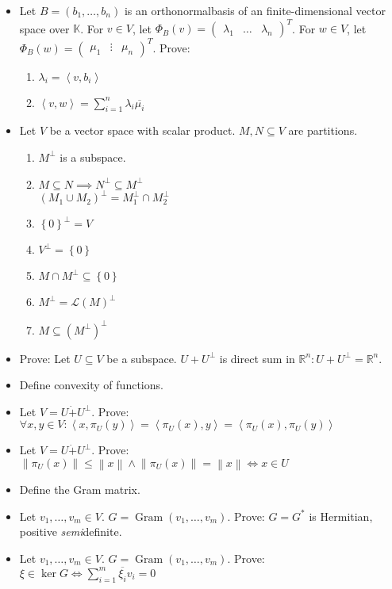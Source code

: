 \documentclass[a4paper]{article}
\newcommand{\set}[1]{\left\{#1\right\}}
\newcommand{\ip}[2]{\left\langle#1,#2\right\rangle} %
\newcommand{\norm}[1]{\left\|#1\right\|}
\begin{document}
\begin{itemize}
  \item Let $B = (b_1, \ldots, b_n)$ is an orthonormalbasis of an finite-dimensional vector space over $\mathbb K$.
    For $v \in V$, let $\Phi_B(v) = \begin{pmatrix} \lambda_1 & \dots & \lambda_n \end{pmatrix}^T$.
    For $w \in V$, let $\Phi_B(w) = \begin{pmatrix} \mu_1 & \vdots & \mu_n \end{pmatrix}^T$. Prove:
    \begin{enumerate}
      \item $\lambda_i = \ip{v}{b_i}$
      \item $\ip vw = \sum_{i=1}^n \lambda_i \overline{\mu_i}$
    \end{enumerate}
  \item Let $V$ be a vector space with scalar product. $M, N \subseteq V$ are partitions.
    \begin{enumerate}
      \item $M^\bot$ is a subspace.
      \item $M \subseteq N \implies N^\bot \subseteq M^\bot$ \\
        $(M_1 \cup M_2)^\bot = M_1^\bot \cap M_2^\bot$
      \item $\set{0}^\bot = V$
      \item $V^\bot = \set{0}$
      \item $M \cap M^\bot \subseteq \set{0}$
      \item $M^\bot = \mathcal L(M)^\bot$
      \item $M \subseteq (M^\bot)^\bot$
    \end{enumerate}
  \item Prove: Let $U \subseteq V$ be a subspace. $U + U^\bot$ is direct sum in $\mathbb R^n: U + U^\bot = \mathbb R^n$.
  \item Define convexity of functions.
  \item Let $V = U \dot+ U^{\bot}$. Prove: $\forall x, y \in V: \ip{x}{\pi_{U}(y)} = \ip{\pi_U(x)}{y} = \ip{\pi_U(x)}{\pi_U(y)}$
  \item Let $V = U \dot+ U^{\bot}$. Prove: $\norm{\pi_U(x)} \leq \norm{x} \land \norm{\pi_U(x)} = \norm{x} \iff x \in U$
  \item Define the Gram matrix.
  \item Let $v_1, \ldots, v_m \in V$. $G = \operatorname{Gram}(v_1, \ldots, v_m)$. Prove: $G = G^*$ is Hermitian, positive \emph{semi}definite.
  \item Let $v_1, \ldots, v_m \in V$. $G = \operatorname{Gram}(v_1, \ldots, v_m)$. Prove: $\xi \in \ker{G} \iff \sum_{i=1}^m \overline{\xi_i} v_i = 0$

\end{itemize}
\end{document}
